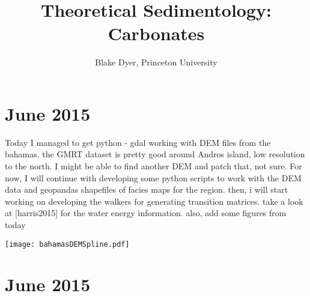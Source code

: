 \documentclass[12pt]{article}
\title{\sffamily \Huge Theoretical Sedimentology: Carbonates}
\author{\sffamily Blake Dyer, Princeton University}
\date{}                                           %
\begin{document}
\graphicspath{{images/}}
\maketitle
\thispagestyle{empty}
\vspace{6em}


\newpage

\setcounter{page}{1}
\section*{ June 2015}
Today I managed to get python - gdal working with DEM files from the bahamas.  the GMRT dataset is pretty good around Andros island, low resolution to the north.  I might be able to find another DEM and patch that, not sure.  For now, I will continue with developing some python scripts to work with the DEM data and geopandas shapefiles of facies maps for the region.  then, i will start working on developing the walkers for generating transition matrices.  take a look at [harris2015] for the water energy information.  also, add some figures from today

\begin{center}
\texttt{[image: bahamasDEMSpline.pdf]}   
\end{center}

\section*{ June 2015}
\end{document}
